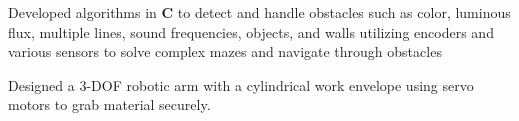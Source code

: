 \documentclass[letterpaper]{deedy-resume}
\begin{document}
\begin{center}
\begin{minipage}[t]{0.66\textwidth}


\vspace{\topsep}
\begin{tightitemize}
\item Developed algorithms in \textbf{C} to detect and handle obstacles such as color, luminous flux, multiple lines, sound frequencies, objects, and walls utilizing encoders and various sensors to solve complex mazes and navigate through obstacles
\vspace{1mm}
\item Designed a 3-DOF robotic arm with a cylindrical work envelope using servo motors to grab material securely.
\end{tightitemize}


\end{minipage}
\end{center}
\end{document}

